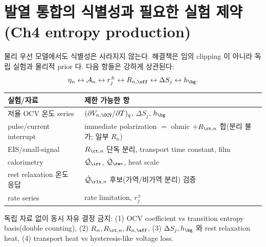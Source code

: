 \section{발열 통합의 식별성과 필요한 실험 제약 (Ch4 entropy production)}\label{sec:ch6_ch4_ident}
물리 우선 모델에서도 식별성은 사라지지 않는다. 해결책은 임의 clipping 이 아니라 독립 실험과 물리적 prior 다.
다음 항들은 강하게 상관된다:
\begin{equation}
\eta_n\leftrightarrow\mathcal A_n\leftrightarrow r_j^\pm\leftrightarrow R_{n,\eff}\leftrightarrow\Delta S_j\leftrightarrow h_\bg.
\label{eq:ch4_ident}
\end{equation}
\begin{longtable}{p{} >{\raggedright\arraybackslash}p{}}
\toprule 실험/자료 & 제한 가능한 항 \\ \midrule \endhead
저율 OCV 온도 series & $(\partial V_{n,\OCV}/\partial T)_q$, $\Delta S_j$, $h_\bg$ \\
pulse/current interrupt & immediate polarization $=$ ohmic $+R_{\ct,n}$ 합(분리 불가; 일부 $R_n$) \\
EIS/small-signal & $R_{\ct,n}$ 단독 분리, transport time constant, film \\
calorimetry & $\dot{\mathcal Q}_{\irr}$, $\dot{\mathcal Q}_{\rev}$, heat scale \\
rest relaxation 온도 응답 & $\dot{\mathcal Q}_{\rlx,n}$ 후보(가역/비가역 분리) 검증 \\
rate series & rate limitation, $r_j^\pm$ \\
\bottomrule
\end{longtable}
독립 자료 없이 동시 자유 결정 금지: (1) OCV coefficient vs transition entropy basis(double counting),
(2) $R_n,R_{\ct,n},R_{n,\eff}$, (3) $\Delta S_j,h_\bg$ 와 rest relaxation heat, (4) transport heat vs
hysteresis-like voltage loss.

